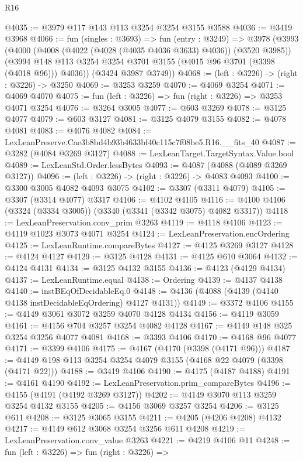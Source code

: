 \begin{lexlean}{R16}
\begin{coremodule}
@4035 := @3979 @117 @143 @113 @3254 @3254 @3155 @3588
@4036 := @3419 @3968
@4066 := fun (singles : @3693) =>
  fun (entry : @3249) =>
  @3978
    (@3993
      (@4000
        (@4008 (@4022 (@4028 (@4035 @4036 @3633) @4036)) (@3520 @3985))
        (@3994 @148 @113 @3254 @3254 @3701 @3155 (@4015 @96 @3701 (@3398 (@4018 @96))) @4036))
      (@3424 @3987 @3749))
@4068 := (left : @3226) -> (right : @3226) -> @3250
@4069 := @3253 @3259
@4070 := @4069 @3254
@4071 := @4069 @4070
@4075 := fun (left : @3226) => fun (right : @3226) => @3253 @4071 @3254
@4076 := @3264 @3005
@4077 := @603 @3269
@4078 := @3125 @4077
@4079 := @603 @3127
@4081 := @3125 @4079 @3155
@4082 := @4078 @4081
@4083 := @4076 @4082
@4084 := LexLeanPreserve.Cae3b8bd4b93b4633bf40c115c7f08be5.R16.__fits_40
@4087 := @3282 (@4084 @3269 @3127)
@4088 := LexLeanTarget.TargetSyntax.Value.bool
@4089 := LexLeanStd.Order.lessBytes
@4093 := @4087 (@4088 (@4089 @3269 @3127))
@4096 := (left : @3226) -> (right : @3226) -> @4083 @4093
@4100 := @3300 @3005 @4082 @4093 @3075
@4102 := @3307 (@3311 @4079)
@4105 := @3307 (@3314 @4077) @3317
@4106 := @4102 @4105
@4116 := @4100 @4106 (@3324 (@3334 @3005)) (@3340 (@3341 (@3342 @3075) @4082 @3317))
@4118 := LexLeanPreservation.conv_prim @3263
@4119 := @4118 @4106
@4123 := @4119 @1023 @3073 @4071 @3254
@4124 := LexLeanPreservation.encOrdering
@4125 := LexLeanRuntime.compareBytes
@4127 := @4125 @3269 @3127
@4128 := @4124 @4127
@4129 := @3125 @4128
@4131 := @4125 @610 @3064
@4132 := @4124 @4131
@4134 := @3125 @4132 @3155
@4136 := @4123 (@4129 @4134)
@4137 := LexLeanRuntime.equal
@4138 := Ordering
@4139 := @4137 @4138
@4140 := instBEqOfDecidableEq.{0}
@4148 := @4136 (@4088 (@4139 (@4140 @4138 instDecidableEqOrdering) @4127 @4131))
@4149 := @3372 @4106
@4155 := @4149 @3061 @3072 @3259 @4070 @4128 @4134
@4156 := @4119 @3059
@4161 := @4156 @704 @3257 @3254 @4082 @4128
@4167 := @4149 @148 @325 @3254 @3256 @4077 @4081
@4168 := @3393 @4106
@4170 := @4168 @96 @4077
@4171 := @3399 @4106
@4175 := @4167 (@4170 (@3398 (@4171 @96)))
@4187 := @4149 @198 @113 @3254 @3254 @4079 @3155 (@4168 @22 @4079 (@3398 (@4171 @22)))
@4188 := @3419 @4106
@4190 := @4175 (@4187 @4188)
@4191 := @4161 @4190
@4192 := LexLeanPreservation.prim_compareBytes
@4196 := @4155 (@4191 (@4192 @3269 @3127))
@4202 := @4149 @3070 @113 @3259 @3254 @4132 @3155
@4205 := @4156 @3069 @3257 @3254
@4206 := @3125 @611
@4208 := @3125 @3065 @3155
@4211 := @4205 (@4206 @4208) @4132
@4217 := @4149 @612 @3068 @3254 @3256 @611 @4208
@4219 := LexLeanPreservation.conv_value @3263
@4221 := @4219 @4106 @11
@4248 := fun (left : @3226) =>
  fun (right : @3226) =>

\end{coremodule}
\end{lexlean}
